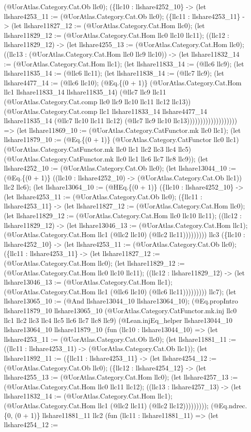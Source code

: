 \documentclass[11pt]{article}
\begin{document}
(@UorAtlas.Category.Cat.Ob llc0); (\{llc10 : llshare4252\_10\} -> (let llshare4253\_11 := (@UorAtlas.Category.Cat.Ob llc0); (\{llc11 : llshare4253\_11\} -> (let llshare11827\_12 := (@UorAtlas.Category.Cat.Hom llc0); (let llshare11829\_12 := (@UorAtlas.Category.Cat.Hom llc0 llc10 llc11); ((llc12 : llshare11829\_12) -> (let llshare4255\_13 := (@UorAtlas.Category.Cat.Hom llc0); ((llc13 : (@UorAtlas.Category.Cat.Hom llc0 llc9 llc10)) -> (let llshare11832\_14 := (@UorAtlas.Category.Cat.Hom llc1); (let llshare11833\_14 := (@llc6 llc9); (let llshare11835\_14 := (@llc6 llc11); (let llshare11838\_14 := (@llc7 llc9); (let llshare4477\_14 := (@llc6 llc10); (@Eq.\{(0 + 1)\} (@UorAtlas.Category.Cat.Hom llc1 llshare11833\_14 llshare11835\_14) (@llc7 llc9 llc11 (@UorAtlas.Category.Cat.comp llc0 llc9 llc10 llc11 llc12 llc13)) (@UorAtlas.Category.Cat.comp llc1 llshare11833\_14 llshare4477\_14 llshare11835\_14 (@llc7 llc10 llc11 llc12) (@llc7 llc9 llc10 llc13))))))))))))))))))) => (let llshare11869\_10 := (@UorAtlas.Category.CatFunctor.mk llc0 llc1); (let llshare11879\_10 := (@Eq.\{(0 + 1)\} (@UorAtlas.Category.CatFunctor llc0 llc1) (@UorAtlas.Category.CatFunctor.mk llc0 llc1 llc2 llc3 llc4 llc5) (@UorAtlas.Category.CatFunctor.mk llc0 llc1 llc6 llc7 llc8 llc9)); (let llshare4252\_10 := (@UorAtlas.Category.Cat.Ob llc0); (let llshare13044\_10 := (@Eq.\{(0 + 1)\} ((llc10 : llshare4252\_10) -> (@UorAtlas.Category.Cat.Ob llc1)) llc2 llc6); (let llshare13064\_10 := (@HEq.\{(0 + 1)\} (\{llc10 : llshare4252\_10\} -> (let llshare4253\_11 := (@UorAtlas.Category.Cat.Ob llc0); (\{llc11 : llshare4253\_11\} -> (let llshare11827\_12 := (@UorAtlas.Category.Cat.Hom llc0); (let llshare11829\_12 := (@UorAtlas.Category.Cat.Hom llc0 llc10 llc11); ((llc12 : llshare11829\_12) -> (let llshare13046\_13 := (@UorAtlas.Category.Cat.Hom llc1); (@UorAtlas.Category.Cat.Hom llc1 (@llc2 llc10) (@llc2 llc11))))))))) llc3 (\{llc10 : llshare4252\_10\} -> (let llshare4253\_11 := (@UorAtlas.Category.Cat.Ob llc0); (\{llc11 : llshare4253\_11\} -> (let llshare11827\_12 := (@UorAtlas.Category.Cat.Hom llc0); (let llshare11829\_12 := (@UorAtlas.Category.Cat.Hom llc0 llc10 llc11); ((llc12 : llshare11829\_12) -> (let llshare13046\_13 := (@UorAtlas.Category.Cat.Hom llc1); (@UorAtlas.Category.Cat.Hom llc1 (@llc6 llc10) (@llc6 llc11))))))))) llc7); (let llshare13065\_10 := (@And llshare13044\_10 llshare13064\_10); (@Eq.propIntro llshare11879\_10 llshare13065\_10 (@UorAtlas.Category.CatFunctor.mk.inj llc0 llc1 llc2 llc3 llc4 llc5 llc6 llc7 llc8 llc9) (@Lean.injEq\_helper llshare13044\_10 llshare13064\_10 llshare11879\_10 (fun (llc10 : llshare13044\_10) => (let llshare4253\_11 := (@UorAtlas.Category.Cat.Ob llc0); (let llshare11881\_11 := ((llc11 : llshare4253\_11) -> (@UorAtlas.Category.Cat.Ob llc1)); (let llshare11892\_11 := (\{llc11 : llshare4253\_11\} -> (let llshare4254\_12 := (@UorAtlas.Category.Cat.Ob llc0); (\{llc12 : llshare4254\_12\} -> (let llshare4255\_13 := (@UorAtlas.Category.Cat.Hom llc0); (let llshare4257\_13 := (@UorAtlas.Category.Cat.Hom llc0 llc11 llc12); ((llc13 : llshare4257\_13) -> (let llshare11832\_14 := (@UorAtlas.Category.Cat.Hom llc1); (@UorAtlas.Category.Cat.Hom llc1 (@llc2 llc11) (@llc2 llc12))))))))); (@Eq.ndrec.\{0, (0 + 1)\} llshare11881\_11 llc2 (fun (llc11 : llshare11881\_11) => (let llshare4254\_12 := 
\end{document}
